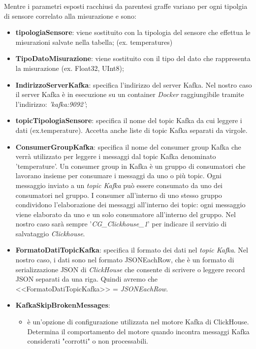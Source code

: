     Mentre i parametri esposti racchiusi da parentesi graffe variano per ogni tipolgia di sensore correlato alla misurazione e sono:
    \begin{itemize}
        \item \textbf{tipologiaSensore}: viene sostituito con la tipologia del sensore che effettua le misurazioni salvate nella tabella; (ex. temperatures)
        \item \textbf{TipoDatoMisurazione}: viene sostituito con il tipo del dato che rappresenta la misurazione (ex. Float32, UInt8);
        \item \textbf{IndirizzoServerKafka}: specifica l'indirizzo del server Kafka.
        Nel nostro caso il server Kafka è in esecuzione su un container \textit{Docker} raggiungibile tramite l'indirizzo:
         \textit{'kafka:9092'};
        \item \textbf{topicTipologiaSensore}: specifica il nome del topic Kafka da cui leggere i dati (ex.temperature). Accetta anche liste di topic Kafka separati da virgole.
        \item \textbf{ConsumerGroupKafka}: specifica il nome del consumer group Kafka che verrà utilizzato per leggere i messaggi dal topic Kafka denominato 'temperature'.
        Un consumer group in Kafka è un gruppo di consumatori che lavorano insieme per consumare i messaggi da uno o più topic. Ogni messaggio inviato a un \textit{topic Kafka} può essere consumato da uno dei consumatori nel gruppo. I consumer all'interno di uno stesso gruppo condividono l'elaborazione dei messaggi all'interno dei topic: ogni messaggio viene elaborato da uno e un solo consumatore all'interno del gruppo. Nel nostro caso sarà sempre '\textit{CG\_Clickhouse\_1}' per indicare il servizio di salvataggio \textit{Clickhouse}.
        \item \textbf{FormatoDatiTopicKafka}: specifica il formato dei dati nel \textit{topic Kafka}. Nel nostro caso, i dati sono nel formato JSONEachRow, che è un formato di serializzazione JSON di \textit{ClickHouse} che consente di scrivere o leggere record JSON separati da una riga. Quindi avremo che <<FormatoDatiTopicKafka>> = \textit{JSONEachRow}.
        \item \textbf{KafkaSkipBrokenMessages}:
        \begin{itemize}
          \item è un'opzione di configurazione utilizzata nel motore Kafka di ClickHouse. Determina il comportamento del motore quando incontra messaggi Kafka considerati "corrotti" o non processabili.

\end{itemize}
\end{itemize}
